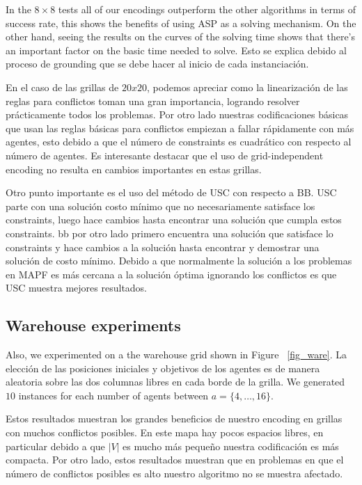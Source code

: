 In the $8\times8$  tests all of our encodings outperform the other algorithms in terms of success rate, this shows the benefits of using ASP as a solving mechanism. On the other hand, seeing the results on the curves of the solving time shows that there's an important factor on the basic time needed to solve. Esto se explica debido al proceso de grounding que se debe hacer al inicio de cada instanciación.

En el caso de las grillas de $20x20$, podemos apreciar como la linearización de las reglas para conflictos toman una gran importancia, logrando resolver prácticamente todos los problemas. Por otro lado nuestras codificaciones básicas que usan las reglas básicas para conflictos empiezan a fallar rápidamente con más agentes, esto debido a que el número de constraints es cuadrático con respecto al número de agentes. Es interesante destacar que el uso de grid-independent encoding no resulta en cambios importantes en estas grillas.

Otro punto importante es el uso del método de USC con respecto a BB. USC parte con una solución costo mínimo que no necesariamente satisface los constraints, luego hace cambios hasta encontrar una solución que cumpla estos constraints. bb por otro lado primero encuentra una solución que satisface lo constraints y hace cambios a la solución hasta encontrar y demostrar una solución de costo mínimo. Debido a que normalmente la solución a los problemas en MAPF es más cercana a la solución óptima ignorando los conflictos es que USC muestra mejores resultados.

\subsection{Warehouse experiments}
Also, we experimented on a the warehouse grid shown in Figure ~\ref{fig_ware}. La elección de las posiciones iniciales y objetivos de los agentes es de manera aleatoria sobre las dos columnas libres en cada borde de la grilla. We generated $10$ instances for each number of agents between $a=\{4, \ldots, 16\}$.

Estos resultados muestran los grandes beneficios de nuestro encoding en grillas con muchos conflictos posibles. En este mapa  hay pocos espacios libres, en particular debido a que $|V|$ es mucho más pequeño nuestra codificación es más compacta. Por otro lado, estos resultados muestran que en problemas en que el número de conflictos posibles es alto nuestro algoritmo no se muestra afectado.



